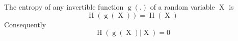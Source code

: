 The entropy of any invertible function $\operatorname{g}(.)$ of a random variable $\operatorname{X}$ is
$$\operatorname{H}(\operatorname{g}(\operatorname{X})) = \operatorname{H}(\operatorname{X})$$
Consequently 
$$\operatorname{H}(\operatorname{g}(\operatorname{X})| \operatorname{X}) = 0$$
